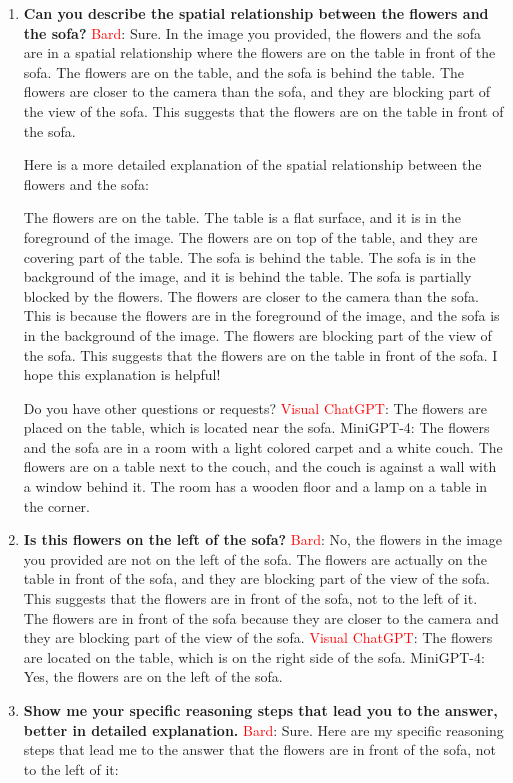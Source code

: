 \begin{enumerate}
    \item \textbf{Can you describe the spatial relationship between the flowers and the sofa?}
    \subitem \textcolor{Red}{Bard}: 
    Sure. In the image you provided, the flowers and the sofa are in a spatial relationship where the flowers are on the table in front of the sofa. The flowers are on the table, and the sofa is behind the table. The flowers are closer to the camera than the sofa, and they are blocking part of the view of the sofa. This suggests that the flowers are on the table in front of the sofa.
    
    Here is a more detailed explanation of the spatial relationship between the flowers and the sofa:
    
    The flowers are on the table. The table is a flat surface, and it is in the foreground of the image. The flowers are on top of the table, and they are covering part of the table.
    The sofa is behind the table. The sofa is in the background of the image, and it is behind the table. The sofa is partially blocked by the flowers.
    The flowers are closer to the camera than the sofa. This is because the flowers are in the foreground of the image, and the sofa is in the background of the image.
    The flowers are blocking part of the view of the sofa. This suggests that the flowers are on the table in front of the sofa.
    I hope this explanation is helpful!
    
    Do you have other questions or requests?
    \subitem \textcolor{red}{Visual ChatGPT}: The flowers are placed on the table, which is located near the sofa.
    \subitem MiniGPT-4: The flowers and the sofa are in a room with a light colored carpet and a white couch. The flowers are on a table next to the couch, and the couch is against a wall with a window behind it. The room has a wooden floor and a lamp on a table in the corner.
    \item \textbf{Is this flowers on the left of the sofa?}
    \subitem \textcolor{Red}{Bard}: 
    No, the flowers in the image you provided are not on the left of the sofa. The flowers are actually on the table in front of the sofa, and they are blocking part of the view of the sofa. This suggests that the flowers are in front of the sofa, not to the left of it. The flowers are in front of the sofa because they are closer to the camera and they are blocking part of the view of the sofa.
    \subitem \textcolor{red}{Visual ChatGPT}: The flowers are located on the table, which is on the right side of the sofa.
    \subitem MiniGPT-4: Yes, the flowers are on the left of the sofa.
    \item \textbf{Show me your specific reasoning steps that lead you to the answer, better in detailed explanation.}
    \subitem \textcolor{Red}{Bard}: 
    Sure. Here are my specific reasoning steps that lead me to the answer that the flowers are in front of the sofa, not to the left of it:
    

\end{enumerate}
